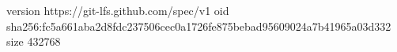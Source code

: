 version https://git-lfs.github.com/spec/v1
oid sha256:fc5a661aba2d8fdc237506cec0a1726fe875bebad95609024a7b41965a03d332
size 432768
